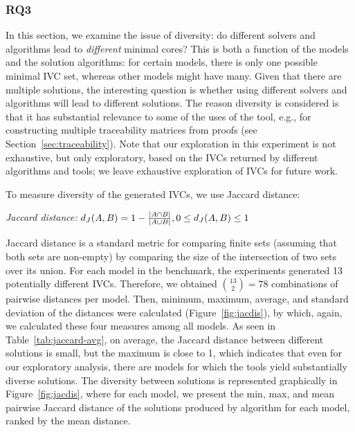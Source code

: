 \subsubsection{RQ3}
In this section, we examine the issue of diversity:
do different solvers and algorithms lead to {\em different} minimal
cores? This is both a function of the models and the solution
algorithms: for certain models, there is only one possible minimal IVC
set, whereas other models might have many. Given that there are
multiple solutions, the interesting question is whether using
different solvers and algorithms will lead to different solutions.
The reason diversity is considered is that it has substantial relevance to
some of the uses of the tool, e.g., for constructing multiple traceability
matrices from proofs (see Section~\ref{sec:traceability}).
Note that our exploration in this experiment is not
exhaustive, but only exploratory, based on the IVCs returned by different
algorithms and tools; we leave exhaustive exploration of
IVCs for future work.


To measure diversity of the generated IVCs, we use Jaccard distance:
\begin{definition}{\emph{Jaccard distance:}}
  \label{def:dj}
  $d_J(\small{A}, \small{B}) = 1 - \frac{|A \cap B|}{|A \cup B|} ,\\ 0 \leq d_J(\small{A}, \small{B}) \leq 1$
\end{definition}
\noindent Jaccard distance is a standard metric for comparing finite
sets (assuming that both sets are non-empty) by comparing the size of
the intersection of two sets over its union. For each model in the
benchmark, the experiments generated 13 potentially different IVCs. Therefore, we
obtained $\binom{13}{2} = 78$ combinations of pairwise distances per
model. Then, minimum, maximum, average, and standard deviation of the
distances were calculated (Figure~\ref{fig:jacdis}), by which, again,
we calculated these four measures among all models. As seen in
Table~\ref{tab:jaccard-avg}, on average, the Jaccard distance between
different solutions is small, but the maximum is close to 1, which
indicates that even for our exploratory analysis, there are models for
which the tools yield substantially diverse solutions. The diversity
between solutions is represented graphically in
Figure~\ref{fig:jacdis}, where for each model, we present the min,
max, and mean pairwise Jaccard distance of the solutions produced by algorithm
\ucalg for each model, ranked by the mean distance.

